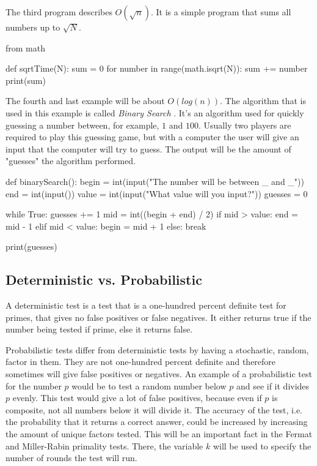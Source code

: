 \documentclass[main.tex]{subfiles}
\begin{document}
The third program describes $O(\sqrt{n})$. It is a simple program that sums all
numbers up to $\sqrt{N}$.

\begin{python}
  from math

  def sqrtTime(N): sum = 0 for number in range(math.isqrt(N)): sum += number
  print(sum)
\end{python}

\vspace{10mm}

The fourth and last example will be about $O(log (n))$. The algorithm that is
used in this example is called \textit{Binary Search} \cite{algh:binary_search}.
It's an algorithm used for quickly guessing a number between, for example, $1$
and $100$. Usually two players are required to play this guessing game, but with
a computer the user will give an input that the computer will try to guess. The
output will be the amount of "guesses" the algorithm performed.

\begin{python}
  def binarySearch(): begin = int(input("The number will be between _ and _\n"))
  end = int(input()) value = int(input("What value will you input?\n")) guesses
  = 0

  while True: guesses += 1 mid = int((begin + end) / 2) if mid > value: end =
  mid - 1 elif mid < value: begin = mid + 1 else: break

  print(guesses)

\end{python}

\subsection{Deterministic vs. Probabilistic}
A deterministic test is a test that is a one-hundred percent definite test for
primes, that gives no false positives or false negatives. It either returns true
if the number being tested if prime, else it returns false.

Probabilistic tests differ from deterministic tests by having a stochastic,
random, factor in them. They are not one-hundred percent definite and therefore
sometimes will give false positives or negatives. An example of a probabilistic
test for the number $p$ would be to test a random number below $p$ and see if it
divides $p$ evenly. This test would give a lot of false positives, because even
if $p$ is composite, not all numbers below it will divide it. The accuracy of
the test, i.e. the probability that it returns a correct answer, could be
increased by increasing the amount of unique factors tested. This will be an
important fact in the Fermat and Miller-Rabin primality tests. There, the
variable $k$ will be used to specify the number of rounds the test will run.
\end{document}
